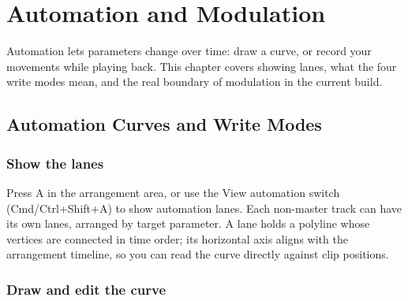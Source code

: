 
\chapter{Automation and Modulation}
\label{ch:automation-modulation}






Automation lets parameters change over time: draw a curve, or record your movements
while playing back. This chapter covers showing lanes, what the four write modes mean,
and the real boundary of modulation in the current build.

\section{Automation Curves and Write Modes}

\subsection{Show the lanes}

Press A in the arrangement area, or use the View automation switch
(Cmd/Ctrl+Shift+A) to show automation lanes. Each non-master track can have its own
lanes, arranged by target parameter. A lane holds a polyline whose vertices are
connected in time order; its horizontal axis aligns with the arrangement timeline, so
you can read the curve directly against clip positions.


\subsection{Draw and edit the curve}

